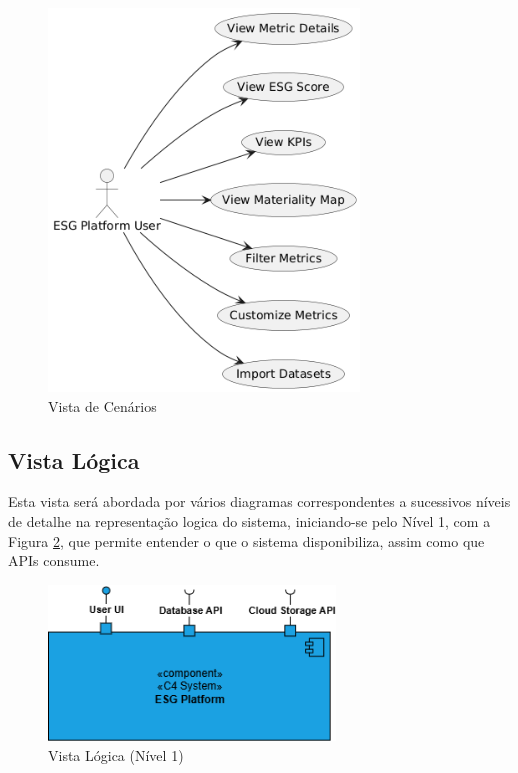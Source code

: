 \begin{figure}[H]
    \centering
    \includegraphics[height=4in,keepaspectratio]{frontmatter/assets/diagrams/Scenario View/Scenario_View.png}
    \caption{Vista de Cenários}
    \label{fig:scenario_view}
\end{figure}

\subsection{Vista Lógica}

Esta vista será abordada por vários diagramas correspondentes a sucessivos níveis de detalhe na representação logica do sistema, iniciando-se pelo Nível 1, com a Figura \ref{fig:logical_view_lv1}, que permite entender o que o sistema disponibiliza, assim como que APIs consume.

\begin{figure}[H]
    \centering
    \includegraphics[width=3in,keepaspectratio]{frontmatter/assets/diagrams/Logical View/Logical View Lv1.drawio.png}
    \caption{Vista Lógica (Nível 1)}
    \label{fig:logical_view_lv1}
\end{figure}

